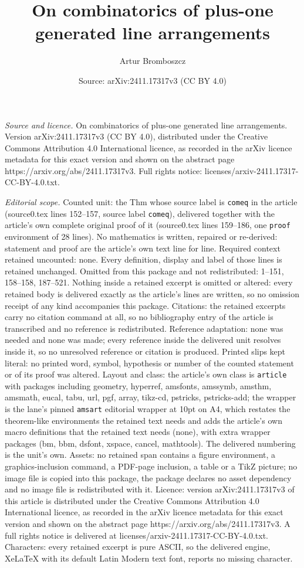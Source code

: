 \documentclass[10pt,a4paper]{amsart}
\title[On combinatorics of plus-one generated line arrangements]{On combinatorics of plus-one generated line arrangements}
\author{Artur Bromboszcz}
\date{Source: arXiv:2411.17317v3 (CC BY 4.0)}
\begin{document}
\maketitle

\noindent\emph{Source and licence.} On combinatorics of plus-one generated line arrangements. Version arXiv:2411.17317v3 (CC BY 4.0), distributed under the Creative Commons Attribution 4.0 International licence, as recorded in the arXiv licence metadata for this exact version and shown on the abstract page https://arxiv.org/abs/2411.17317v3. Full rights notice: licenses/arxiv-2411.17317-CC-BY-4.0.txt.\par\smallskip

\noindent\textit{Editorial scope.} Counted unit: the Thm whose source label is \texttt{comeq} in the article (source0.tex lines 152--157, source label \texttt{comeq}), delivered together with the article's own complete original proof of it (source0.tex lines 159--186, one \texttt{proof} environment of 28 lines). No mathematics is written, repaired or re-derived: statement and proof are the article's own text line for line. Required context retained uncounted: none. Every definition, display and label of those lines is retained unchanged. Omitted from this package and not redistributed: 1--151, 158--158, 187--521. Nothing inside a retained excerpt is omitted or altered: every retained body is delivered exactly as the article's lines are written, so no omission receipt of any kind accompanies this package. Citations: the retained excerpts carry no citation command at all, so no bibliography entry of the article is transcribed and no reference is redistributed. Reference adaptation: none was needed and none was made; every reference inside the delivered unit resolves inside it, so no unresolved reference or citation is produced. Printed slips kept literal: no printed word, symbol, hypothesis or number of the counted statement or of its proof was altered. Layout and class: the article's own class is \texttt{article} with packages including geometry, hyperref, amsfonts, amssymb, amsthm, amsmath, eucal, tabu, url, pgf, array, tikz-cd, pstricks, pstricks-add; the wrapper is the lane's pinned \texttt{amsart} editorial wrapper at 10pt on A4, which restates the theorem-like environments the retained text needs and adds the article's own macro definitions that the retained text needs (none), with extra wrapper packages (bm, bbm, dsfont, xspace, cancel, mathtools). The delivered numbering is the unit's own. Assets: no retained span contains a figure environment, a graphics-inclusion command, a PDF-page inclusion, a table or a TikZ picture; no image file is copied into this package, the package declares no asset dependency and no image file is redistributed with it. Licence: version arXiv:2411.17317v3 of this article is distributed under the Creative Commons Attribution 4.0 International licence, as recorded in the arXiv licence metadata for this exact version and shown on the abstract page https://arxiv.org/abs/2411.17317v3. A full rights notice is delivered at licenses/arxiv-2411.17317-CC-BY-4.0.txt. Characters: every retained excerpt is pure ASCII, so the delivered engine, XeLaTeX with its default Latin Modern text font, reports no missing character.
\end{document}
